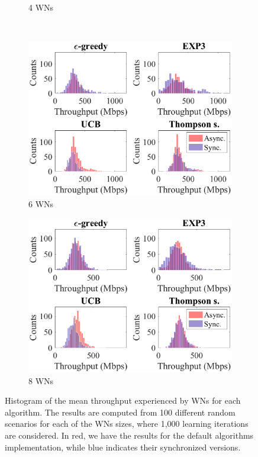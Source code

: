 \documentclass[preprint,12pt]{article}
\begin{document}
\begin{figure}[h!]
\begin{subfigure}[b]{.4\textwidth}
		\caption{4 WNs}\label{fig:hist_mean_tpt_4_WNs}
	\end{subfigure}\\
	\begin{subfigure}[b]{.4\textwidth}
		\includegraphics[width=\textwidth]{images/hist_mean_tpt_6_WNs}
		\caption{6 WNs}\label{fig:hist_mean_tpt_6_WNs}
	\end{subfigure}
	\begin{subfigure}[b]{.4\textwidth}
		\includegraphics[width=\textwidth]{images/hist_mean_tpt_8_WNs}
		\caption{8 WNs}\label{fig:hist_mean_tpt_8_WNs}
	\end{subfigure}
	\caption{Histogram of the mean throughput experienced by WNs for each algorithm. The results are computed from 100 different random scenarios for each of the WNs sizes, where 1,000 learning iterations are considered. In red, we have the results for the default algorithms implementation, while blue indicates their synchronized versions.}
	\label{fig:scalability_sync_vs_async}
\end{figure}
\end{document}
